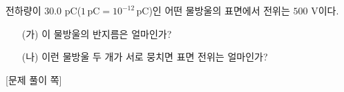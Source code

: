 \documentclass[tightenlines,floatfix,nofootinbib,superscriptaddress,fleqn]{revtex4}
\begin{document}
전하량이 $30.0$ pC($1\,\mathrm{pC} = 10^{-12}\,\mathrm{pC}$)인 어떤
물방울의 표면에서 전위는 $500$ V이다. 
\begin{itemize}
\item[(가)] 이 물방울의 반지름은 얼마인가?  
\item[(나)] 이런 물방울 두 개가 서로 뭉치면 표면 전위는 얼마인가? 
\end{itemize}
\newpage
{\color{gray} [문제 풀이 쪽]}
\end{document}

